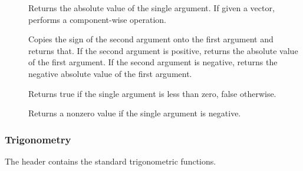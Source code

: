 \begin{description}
\item[]  Returns the absolute value of
  the single argument. If given a vector, performs a component-wise
  operation.
\item[] Copies the sign of the second argument onto the
  first argument and returns that. If the second argument is positive,
  returns the absolute value of the first argument. If the second argument
  is negative, returns the negative absolute value of the first argument.
\item[]  Returns true if the single
  argument is less than zero, false otherwise.
\item[] Returns a nonzero value if the single argument is
  negative.
\end{description}

\subsubsection{Trigonometry}

The  header contains the standard trigonometric
functions.

